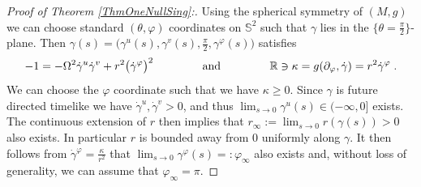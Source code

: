 \documentclass[reqno]{article}
\newcommand{\R}{\mathbb{R}}
\begin{document}
\begin{proof}[Proof of Theorem \ref{ThmOneNullSing}:]
Using the spherical symmetry of $(M,g)$ we can choose standard $(\theta, \varphi)$ coordinates on $\mathbb{S}^2$ such that $\gamma$ lies in the $\{\theta = \frac{\pi}{2}\}$-plane. Then $\gamma(s) = \big(\gamma^u(s), \gamma^v(s), \frac{\pi}{2}, \gamma^\varphi(s)\big)$ satisfies \begin{equation}
\label{EqG}-1 = -\Omega^2 \dot{\gamma}^u \dot{\gamma}^v + r^2 \big(\dot{\gamma}^\varphi\big)^2 \qquad \qquad \textnormal{ and } \qquad \qquad \R \ni \kappa = g(\partial_\varphi, \dot{\gamma}) = r^2 \dot{\gamma}^\varphi \;.
\end{equation}
We can choose the $\varphi$ coordinate such that we have $\kappa \geq 0$. Since $\gamma$ is future directed timelike we have $\dot{\gamma}^u, \dot{\gamma}^v >0$, and thus $\lim_{s \to 0} \gamma^u(s) \in (-\infty, 0]$ exists. The continuous extension of $r$ then implies that $r_\infty := \lim_{s \to 0} r(\gamma(s)) >0$ also exists. In particular $r$ is bounded away from $0$ uniformly along $\gamma$. It then follows from $\dot{\gamma}^\varphi = \frac{\kappa}{r^2}$ that $\lim_{s \to 0} \gamma^\varphi(s) =: \varphi_\infty$ also exists and, without loss of generality, we can assume that $\varphi_\infty = \pi$.


\end{proof}
\end{document}
